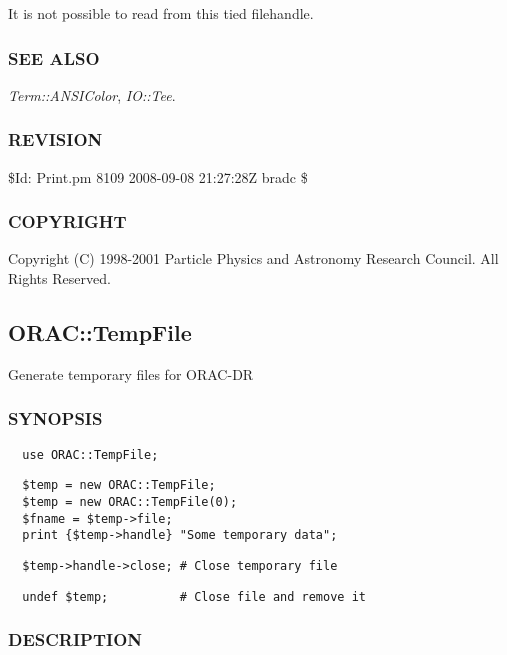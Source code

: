 \begin{description}
It is not possible to read from this tied filehandle.

\subsubsection*{SEE ALSO\label{ORAC::Print_SEE_ALSO}}


\emph{Term::ANSIColor}, \emph{IO::Tee}.

\subsubsection*{REVISION\label{ORAC::Print_REVISION}}


\$Id: Print.pm 8109 2008-09-08 21:27:28Z bradc \$

\subsubsection*{COPYRIGHT\label{ORAC::Print_COPYRIGHT}}


Copyright (C) 1998-2001 Particle Physics and Astronomy Research
Council. All Rights Reserved.

\subsection{ORAC::TempFile\label{ORAC::TempFile}}


Generate temporary files for ORAC-DR

\subsubsection*{SYNOPSIS\label{ORAC::TempFile_SYNOPSIS}}
\begin{verbatim}
  use ORAC::TempFile;
\end{verbatim}
\begin{verbatim}
  $temp = new ORAC::TempFile;
  $temp = new ORAC::TempFile(0);
  $fname = $temp->file;
  print {$temp->handle} "Some temporary data";
\end{verbatim}
\begin{verbatim}
  $temp->handle->close; # Close temporary file
\end{verbatim}
\begin{verbatim}
  undef $temp;          # Close file and remove it
\end{verbatim}
\subsubsection*{DESCRIPTION\label{ORAC::TempFile_DESCRIPTION}}



\end{description}
